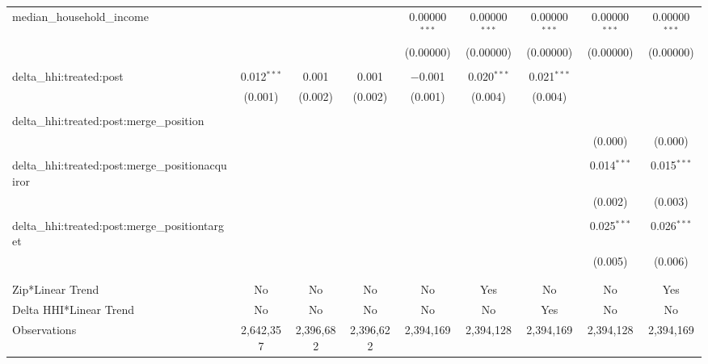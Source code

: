 \begin{table}[H]
{\begin{tabular}{@{\extracolsep{5pt}}lcccccccc}
  median\_household\_income &  &  &  & 0.00000$^{***}$ & 0.00000$^{***}$ & 0.00000$^{***}$ & 0.00000$^{***}$ & 0.00000$^{***}$ \\  

   &  &  &  & (0.00000) & (0.00000) & (0.00000) & (0.00000) & (0.00000) \\  

   & & & & & & & & \\  

  delta\_hhi:treated:post & 0.012$^{***}$ & 0.001 & 0.001 & $-$0.001 & 0.020$^{***}$ & 0.021$^{***}$ &  &  \\  

   & (0.001) & (0.002) & (0.002) & (0.001) & (0.004) & (0.004) &  &  \\  

   & & & & & & & & \\  

  delta\_hhi:treated:post:merge\_position &  &  &  &  &  &  &  &  \\  

   &  &  &  &  &  &  & (0.000) & (0.000) \\  

   & & & & & & & & \\  

  delta\_hhi:treated:post:merge\_positionacquiror &  &  &  &  &  &  & 0.014$^{***}$ & 0.015$^{***}$ \\  

   &  &  &  &  &  &  & (0.002) & (0.003) \\  

   & & & & & & & & \\  

  delta\_hhi:treated:post:merge\_positiontarget &  &  &  &  &  &  & 0.025$^{***}$ & 0.026$^{***}$ \\  

   &  &  &  &  &  &  & (0.005) & (0.006) \\  

   & & & & & & & & \\  

 \hline \\[-1.8ex]  

 Zip*Linear Trend & No & No & No & No & Yes & No & No & Yes \\  

 Delta HHI*Linear Trend & No & No & No & No & No & Yes & No & No \\  

 Observations & 2,642,357 & 2,396,682 & 2,396,622 & 2,394,169 & 2,394,128 & 2,394,169 & 2,394,128 & 2,394,169 \\  


\end{tabular}}
\end{table}
